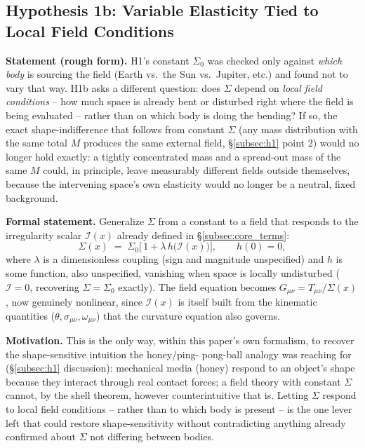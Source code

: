 \documentclass[12pt, a4paper]{article}
\begin{document}
\subsection{Hypothesis 1b: Variable Elasticity Tied to Local Field Conditions}
\label{subsec:h1b}
\textbf{Statement (rough form).} H1's constant $\Sigma_0$ was checked
only against \emph{which body} is sourcing the field (Earth vs.\ the
Sun vs.\ Jupiter, etc.) and found not to vary that way. H1b asks a
different question: does $\Sigma$ depend on \emph{local field
conditions} -- how much space is already bent or disturbed right
where the field is being evaluated -- rather than on which body is
doing the bending? If so, the exact shape-indifference that follows
from constant $\Sigma$ (any mass distribution with the same total $M$
produces the same external field, \S\ref{subsec:h1} point 2) would no
longer hold exactly: a tightly concentrated mass and a spread-out mass
of the same $M$ could, in principle, leave measurably different
fields outside themselves, because the intervening space's own
elasticity would no longer be a neutral, fixed background.

\textbf{Formal statement.} Generalize $\Sigma$ from a constant to a
field that responds to the irregularity scalar $\mathcal{I}(x)$
already defined in \S\ref{subsec:core_terms}:
\begin{equation}
\Sigma(x) \;=\; \Sigma_0\Big[\,1 + \lambda\, h\big(\mathcal{I}(x)\big)\Big],
\qquad h(0) = 0,
\end{equation}
where $\lambda$ is a dimensionless coupling (sign and magnitude
unspecified) and $h$ is some function, also unspecified, vanishing
when space is locally undisturbed ($\mathcal{I}=0$, recovering
$\Sigma=\Sigma_0$ exactly). The field equation becomes
$G_{\mu\nu} = T_{\mu\nu}/\Sigma(x)$, now genuinely nonlinear, since
$\mathcal{I}(x)$ is itself built from the kinematic quantities
($\theta,\sigma_{\mu\nu},\omega_{\mu\nu}$) that the curvature equation
also governs.

\textbf{Motivation.} This is the only way, within this paper's own
formalism, to recover the shape-sensitive intuition the honey/ping-
pong-ball analogy was reaching for (\S\ref{subsec:h1} discussion):
mechanical media (honey) respond to an object's shape because they
interact through real contact forces; a field theory with constant
$\Sigma$ cannot, by the shell theorem, however counterintuitive that
is. Letting $\Sigma$ respond to local field conditions -- rather than
to which body is present -- is the one lever left that could restore
shape-sensitivity without contradicting anything already confirmed
about $\Sigma$ not differing between bodies.
\end{document}
